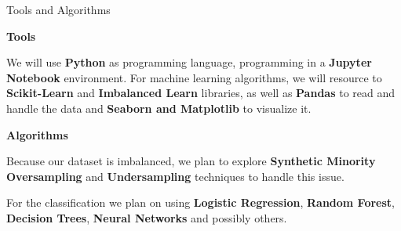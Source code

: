 \begin{frame}{Tools and Algorithms}

    \textbf{Tools}
    \vspace{0.5em}
    
    We will use \textbf{Python} as programming language, programming in a \textbf{Jupyter Notebook} environment. For machine learning algorithms, we will resource to \textbf{Scikit-Learn} and \textbf{Imbalanced Learn} libraries, as well as \textbf{Pandas} to read and handle the data and \textbf{Seaborn and Matplotlib} to visualize it.

    \vspace{1em}
    
    \textbf{Algorithms}
    \vspace{0.5em}
    
    Because our dataset is imbalanced, we plan to explore \textbf{Synthetic Minority Oversampling} and \textbf{Undersampling} techniques to handle this issue.

    \vspace{0.5em}
    
    For the classification we plan on using \textbf{Logistic Regression}, \textbf{Random Forest}, \textbf{Decision Trees}, \textbf{Neural Networks} and possibly others.

\end{frame}
